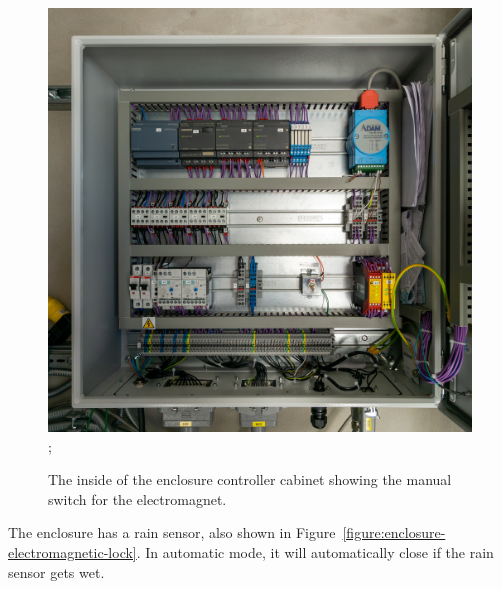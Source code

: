 \begin{figure}
\begin{center}
{\begin{labeled}{\includegraphics[width=\linewidth]{figures/enclosure-controller-inside-ddotioan.jpg}}
;
\end{labeled}}
\fi
\end{center}
\caption{The inside of the enclosure controller cabinet showing the manual switch for the electromagnet.}
\label{figure:enclosure-controller-manual-lock-switch}
\end{figure}

The enclosure has a rain sensor, also shown in Figure~\ref{figure:enclosure-electromagnetic-lock}. In automatic mode, it will automatically close if the rain sensor gets wet.

